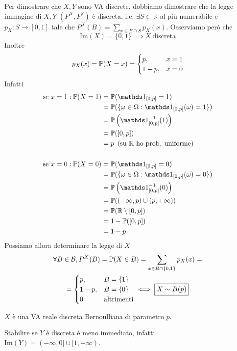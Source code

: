\begin{enumerate}
Per dimostrare che $X,Y$ sono VA discrete, dobbiamo dimostrare che la legge immagine di $X,Y$ $\left(P^{X} ,P^{Y}\right)$ è discreta, i.e. $\exists S\subset \mathbb{R}$ al più numerabile e $p_{X} :S\rightarrow [0,1]$ tale che $P^{X}(B) =\sum\limits_{x\in B\cap S} p_{X}(x)$. Osserviamo però che
\begin{equation*}
\mathrm{Im}(X) =\{0,1\} \implies X\ \text{discreta}
\end{equation*}
Inoltre
\begin{equation*}
p_{X}(x) =\mathbb{P}(X=x) =
\begin{cases}
p, & x=1\\
1-p, & x=0
\end{cases}
\end{equation*}
Infatti
\begin{align*}
\text{se} \ x=1:\PP(X=1) & =\PP(\Ind_{[0,p]} =1)\\
 & =\PP(\{\omega \in \Omega :\Ind_{[0,p]}(\omega) =1\})\\
 & =\PP\left(\Ind_{[0,p]}^{-1}(1)\right)\\
 & =\PP([0,p])\\
 & =p\ \left(\text{su} \ \mathbb{R} \ \text{ho prob. uniforme}\right)\\
 & \\
\text{se} \ x=0:\PP(X=0) & =\PP(\Ind_{[0,p]} =0)\\
 & =\PP(\{\omega \in \Omega :\Ind_{[0,p]}(\omega) =0\})\\
 & =\PP\left(\Ind_{[0,p]}^{-1}(0)\right)\\
 & =\PP((-\infty ,p) \cup (p,+\infty))\\
 & =\PP(\mathbb{R} \setminus [0,p])\\
 & =1-\PP([0,p])\\
 & =1-p
\end{align*}
Possiamo allora determinare la legge di $X$
\begin{gather*}
\forall B\in \mathcal{B} ,P^{X}(B) =\mathbb{P}(X\in B) =\sum\limits_{x\in B\cap \{0,1\}} p_{X}(x) =\\
=
\begin{cases}
p, & B=\{1\}\\
1-p, & B=\{0\}\\
0 & \text{altrimenti}
\end{cases}
\iff \boxed{X\sim B(p)}
\end{gather*}

$X$ è una VA reale discreta Bernoulliana di parametro $p$.

Stabilire se $Y$ è discreta è meno immediato, infatti $\mathrm{Im}(Y) =(-\infty ,0] \cup [ 1,+\infty)$.


\end{enumerate}
